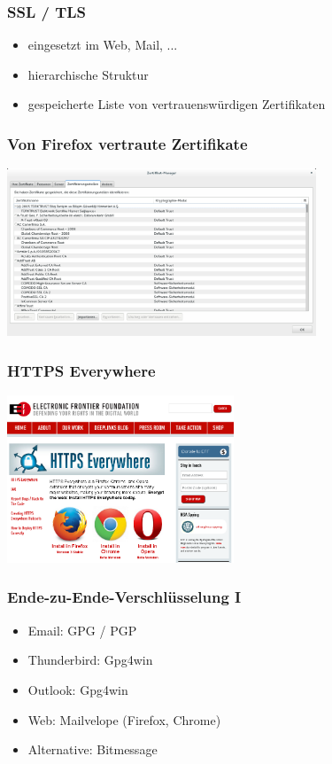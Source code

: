 \documentclass[12pt]{beamer}
\begin{document}
\begin{frame}
    \frametitle{SSL / TLS}
    \begin{itemize}
      \item<2-> eingesetzt im Web, Mail, ...
      \item<3-> hierarchische Struktur
      \item<4-> gespeicherte Liste von vertrauenswürdigen Zertifikaten
    \end{itemize}
\end{frame}

\begin{frame}
    \frametitle{Von Firefox vertraute Zertifikate}
    \begin{center}
      \includegraphics[height=5cm]{img/zertifikate.png}
    \end{center}
\end{frame}

\begin{frame}
  \frametitle{HTTPS Everywhere}
    \begin{center}
      \includegraphics[height=5cm]{img/https-everywhere.png}
    \end{center}
\end{frame}

\begin{frame}
    \frametitle{Ende-zu-Ende-Verschlüsselung I}
    \begin{itemize}\Large
      \item Email: GPG / PGP
      \item Thunderbird: Gpg4win
      \item Outlook: Gpg4win
      \item Web: Mailvelope (Firefox, Chrome)
      \item Alternative: Bitmessage
    \end{itemize}
\end{frame}
\end{document}
